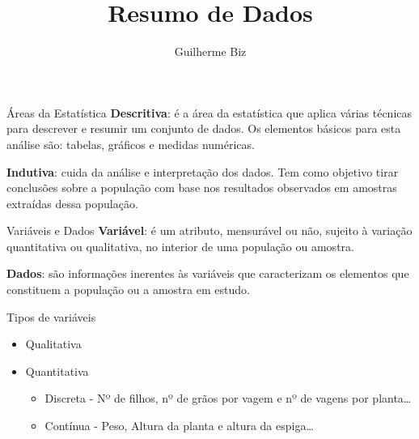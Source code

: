 \documentclass[
  ignorenonframetext,
]{beamer}
\title{Resumo de Dados}
\author{Guilherme Biz}
\date{}
\begin{document}
\frame{\titlepage}


\begin{frame}{Áreas da Estatística}
\label{uxe1reas-da-estatuxedstica}
\textbf{Descritiva}: é a área da estatística que aplica várias técnicas
para descrever e resumir um conjunto de dados. Os elementos básicos para
esta análise são: tabelas, gráficos e medidas numéricas.

\textbf{Indutiva}: cuida da análise e interpretação dos dados. Tem como
objetivo tirar conclusões sobre a população com base nos resultados
observados em amostras extraídas dessa população.
\end{frame}

\begin{frame}{Variáveis e Dados}
\label{variuxe1veis-e-dados}
\textbf{Variável}: é um atributo, mensurável ou não, sujeito à variação
quantitativa ou qualitativa, no interior de uma população ou amostra.

\textbf{Dados}: são informações inerentes às variáveis que caracterizam
os elementos que constituem a população ou a amostra em estudo.
\end{frame}

\begin{frame}{Tipos de variáveis}
\label{tipos-de-variuxe1veis}
\begin{itemize}
\item
  Qualitativa

\item
  Quantitativa

  \begin{itemize}
  \item
    Discreta - {Nº de filhos, nº de grãos por vagem e nº de vagens por
    planta\ldots{}}
  \item
    Contínua - {Peso, Altura da planta e altura da espiga\ldots{}}
  \end{itemize}
\end{itemize}
\end{frame}
\end{document}
